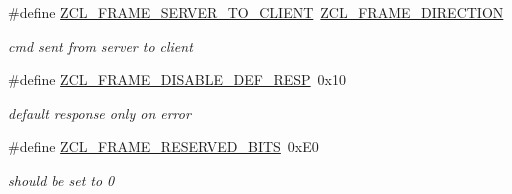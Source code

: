 \begin{DoxyCompactItemize}
\#define \hyperlink{group__zcl_gac173779e7c48817dbd79042d7a189524}{Z\+C\+L\+\_\+\+F\+R\+A\+M\+E\+\_\+\+S\+E\+R\+V\+E\+R\+\_\+\+T\+O\+\_\+\+C\+L\+I\+E\+NT}~\hyperlink{group__zcl_ga38975849d925ebb3643cb9f5d62b68fe}{Z\+C\+L\+\_\+\+F\+R\+A\+M\+E\+\_\+\+D\+I\+R\+E\+C\+T\+I\+ON}
\begin{DoxyCompactList}\small\item\em cmd sent from server to client \end{DoxyCompactList}\item 
\mbox{\label{group__zcl_ga080b9f73f48767fc6af9b5da27d30d70}} 
\#define \hyperlink{group__zcl_ga080b9f73f48767fc6af9b5da27d30d70}{Z\+C\+L\+\_\+\+F\+R\+A\+M\+E\+\_\+\+D\+I\+S\+A\+B\+L\+E\+\_\+\+D\+E\+F\+\_\+\+R\+E\+SP}~0x10
\begin{DoxyCompactList}\small\item\em default response only on error \end{DoxyCompactList}\item 
\mbox{\label{group__zcl_ga5a5d33260e614faaf630df493d0fea1f}} 
\#define \hyperlink{group__zcl_ga5a5d33260e614faaf630df493d0fea1f}{Z\+C\+L\+\_\+\+F\+R\+A\+M\+E\+\_\+\+R\+E\+S\+E\+R\+V\+E\+D\+\_\+\+B\+I\+TS}~0x\+E0
\begin{DoxyCompactList}\small\item\em should be set to 0 \end{DoxyCompactList}\end{DoxyCompactItemize}
